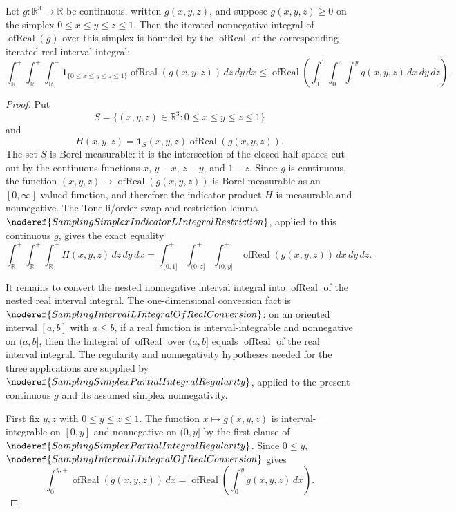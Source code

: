 \begin{helper}
Let \(g:\mathbb R^3\to\mathbb R\) be continuous, written
\(g(x,y,z)\), and suppose \(g(x,y,z)\ge 0\) on the simplex
\(0\le x\le y\le z\le 1\).  Then the iterated nonnegative integral of
\(\operatorname{ofReal}(g)\) over this simplex is bounded by the
\(\operatorname{ofReal}\) of the corresponding iterated real interval
integral:
\[
\int_{\mathbb R}^{+}\int_{\mathbb R}^{+}\int_{\mathbb R}^{+}
\mathbf 1_{\{0\le x\le y\le z\le 1\}}\operatorname{ofReal}(g(x,y,z))
\,dz\,dy\,dx
\le
\operatorname{ofReal}\left(\int_0^1\int_0^z\int_0^y
g(x,y,z)\,dx\,dy\,dz\right).
\]
\end{helper}
\begin{proof}
Put
\[
S=\{(x,y,z)\in\mathbb R^3:0\le x\le y\le z\le 1\}
\]
and
\[
H(x,y,z)=\mathbf 1_S(x,y,z)\operatorname{ofReal}(g(x,y,z)).
\]
The set \(S\) is Borel measurable: it is the intersection of the closed
half-spaces cut out by the continuous functions \(x\), \(y-x\), \(z-y\), and
\(1-z\).  Since \(g\) is continuous, the function
\((x,y,z)\mapsto \operatorname{ofReal}(g(x,y,z))\) is Borel measurable as an
\([0,\infty]\)-valued function, and therefore the indicator product \(H\) is
measurable and nonnegative.  The Tonelli/order-swap and restriction lemma
\(\noderef{SamplingSimplexIndicatorLIntegralRestriction}\), applied to this
continuous \(g\), gives the exact equality
\[
\int_{\mathbb R}^{+}\int_{\mathbb R}^{+}\int_{\mathbb R}^{+}H(x,y,z)
\,dz\,dy\,dx
=
\int_{(0,1]}^{+}\int_{(0,z]}^{+}\int_{(0,y]}^{+}
\operatorname{ofReal}(g(x,y,z))\,dx\,dy\,dz .
\]

It remains to convert the nested nonnegative interval integral into
\(\operatorname{ofReal}\) of the nested real interval integral.  The
one-dimensional conversion fact is
\(\noderef{SamplingIntervalLIntegralOfRealConversion}\): on an oriented
interval \([a,b]\) with \(a\le b\), if a real function is interval-integrable
and nonnegative on \((a,b]\), then the lintegral of \(\operatorname{ofReal}\)
over \((a,b]\) equals \(\operatorname{ofReal}\) of the real interval integral.
The regularity and nonnegativity hypotheses needed for the three applications
are supplied by
\(\noderef{SamplingSimplexPartialIntegralRegularity}\), applied to the present
continuous \(g\) and its assumed simplex nonnegativity.

First fix \(y,z\) with \(0\le y\le z\le 1\).  The function
\(x\mapsto g(x,y,z)\) is interval-integrable on \([0,y]\) and nonnegative on
\((0,y]\) by the first clause of
\(\noderef{SamplingSimplexPartialIntegralRegularity}\).  Since \(0\le y\),
\(\noderef{SamplingIntervalLIntegralOfRealConversion}\) gives
\[
\int_{0}^{y,+}\operatorname{ofReal}(g(x,y,z))\,dx
=
\operatorname{ofReal}\left(\int_0^y g(x,y,z)\,dx\right).
\]


\end{proof}
